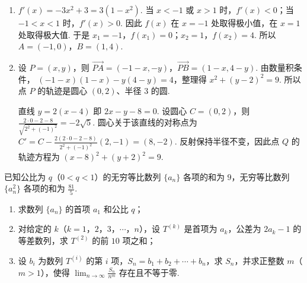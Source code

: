 \begin{solution}
\begin{enumerate}
\item
\(f'(x)=-3x^2+3=3(1-x^2)\).
当 \(x<-1\) 或 \(x>1\) 时，\(f'(x)<0\)；当 \(-1<x<1\) 时，\(f'(x)>0\). 因此 \(f(x)\) 在 \(x=-1\) 处取得极小值，在 \(x=1\) 处取得极大值. 于是
\(x_1=-1\)，\(f(x_1)=0\)；\(x_2=1\)，\(f(x_2)=4\).
所以 \(A=(-1,0)\)，\(B=(1,4)\).

\item 设 \(P=(x,y)\)，则
\(\overrightarrow{PA}=(-1-x,-y)\)，\(\overrightarrow{PB}=(1-x,4-y)\).
由数量积条件，
\((-1-x)(1-x)-y(4-y)=4\)，整理得 \(x^2+(y-2)^2=9\).
所以点 \(P\) 的轨迹是圆心 \((0,2)\)、半径 \(3\) 的圆.

直线 \(y=2(x-4)\) 即 \(2x-y-8=0\). 设圆心 \(C=(0,2)\)，则 \(\frac{2\cdot0-2-8}{\sqrt{2^2+(-1)^2}}=-2\sqrt{5}\). 圆心关于该直线的对称点为 \(C'=C-\frac{2(2\cdot0-2-8)}{2^2+(-1)^2}(2,-1)=(8,-2)\). 反射保持半径不变，因此点 \(Q\) 的轨迹方程为 \((x-8)^2+(y+2)^2=9\).
\end{enumerate}
\end{solution}

\begin{problem}
已知公比为 \(q\)（\(0 < q < 1\)）的无穷等比数列 \(\{a_{n}\}\) 各项的和为 \(9\)，无穷等比数列 \(\{a_{n}^{2}\}\) 各项的和为 \(\frac{81}{5}\).

\begin{enumerate}
\item 求数列 \( \{a_{n}\} \) 的首项 \( a_{1} \) 和公比 \(q\)；
\item 对给定的 \(k\)（\(k = 1\)，\(2\)，\(3\)，\(\cdots\)，\(n\)），设 \(T^{(k)}\) 是首项为 \(a_k\)，公差为 \(2a_k - 1\) 的等差数列，求 \(T^{(2)}\) 的前 \(10\) 项之和；
\item 设 \(b_{i}\) 为数列 \(T^{(i)}\) 的第 \(i\) 项，\(S_{n} = b_{1} + b_{2} + \cdots + b_{n}\)，求 \(S_{n}\)，并求正整数 \(m\)（\(m > 1\)），使得 \(\displaystyle\lim_{n \to \infty} \frac{S_{n}}{n^{m}}\) 存在且不等于零.
\end{enumerate}
\end{problem}

